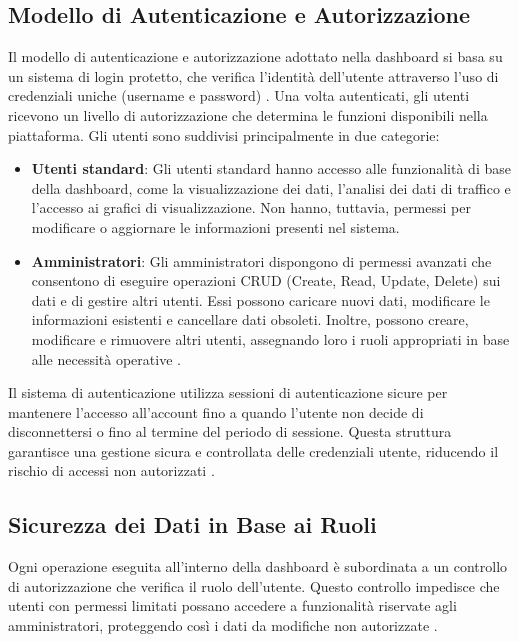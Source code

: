 \subsection{Modello di Autenticazione e Autorizzazione}
Il modello di autenticazione e autorizzazione adottato nella dashboard si basa su un sistema di login protetto, che verifica l’identità dell’utente attraverso l’uso di credenziali uniche (username e password) \cite{ferraiolo2003role}. Una volta autenticati, gli utenti ricevono un livello di autorizzazione che determina le funzioni disponibili nella piattaforma. Gli utenti sono suddivisi principalmente in due categorie:

\begin{itemize}
    \item \textbf{Utenti standard}: Gli utenti standard hanno accesso alle funzionalità di base della dashboard, come la visualizzazione dei dati, l’analisi dei dati di traffico e l’accesso ai grafici di visualizzazione. Non hanno, tuttavia, permessi per modificare o aggiornare le informazioni presenti nel sistema.

    \item \textbf{Amministratori}: Gli amministratori dispongono di permessi avanzati che consentono di eseguire operazioni CRUD (Create, Read, Update, Delete) sui dati e di gestire altri utenti. Essi possono caricare nuovi dati, modificare le informazioni esistenti e cancellare dati obsoleti. Inoltre, possono creare, modificare e rimuovere altri utenti, assegnando loro i ruoli appropriati in base alle necessità operative \cite{sandhu1996role}.
\end{itemize}

Il sistema di autenticazione utilizza sessioni di autenticazione sicure per mantenere l’accesso all’account fino a quando l’utente non decide di disconnettersi o fino al termine del periodo di sessione. Questa struttura garantisce una gestione sicura e controllata delle credenziali utente, riducendo il rischio di accessi non autorizzati \cite{bishop2003computer}.

\subsection{Sicurezza dei Dati in Base ai Ruoli}
Ogni operazione eseguita all'interno della dashboard è subordinata a un controllo di autorizzazione che verifica il ruolo dell’utente. Questo controllo impedisce che utenti con permessi limitati possano accedere a funzionalità riservate agli amministratori, proteggendo così i dati da modifiche non autorizzate \cite{ferraiolo2003role}. 

